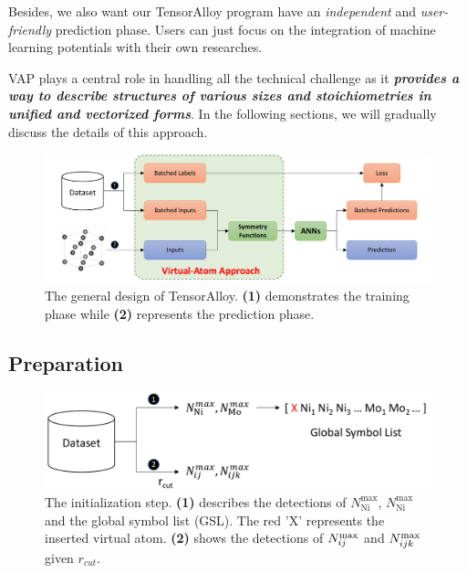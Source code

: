 \documentclass[final,1p,times]{elsarticle}
\begin{document}
Besides, we also want our TensorAlloy program have an \textit{independent} and
\textit{user-friendly} prediction phase. Users can just focus on the integration 
of machine learning potentials with their own researches.

VAP plays a central role in handling all the technical challenge as it 
\textbf{\textit{provides a way to describe structures of various sizes and 
stoichiometries in unified and vectorized forms}}. 
In the following sections, we will gradually discuss the details of this 
approach.

% 
%
\begin{figure}[h!]
\centering
\includegraphics[scale=0.55]{figures/Fig1.pdf}
\caption{\label{fig:program_design} The general design of TensorAlloy. 
\textbf{(1)} demonstrates the training phase while \textbf{(2)} represents the 
prediction phase.
}
\end{figure}

% 
%
\subsection{Preparation}
\label{section:preparation}

% 
%
\begin{figure}[h!]
\centering
\includegraphics[scale=0.6]{figures/Fig2.pdf}
\caption{\label{fig:Fig2} The initialization step. 
\textbf{(1)} describes the detections of $N_{\mathrm{Ni}}^{\mathrm{max}}$, 
$N_{\mathrm{Ni}}^{\mathrm{max}}$ and the global symbol list (GSL). The red 'X' 
represents the inserted virtual atom.
\textbf{(2)} shows the detections of $N_{ij}^{\mathrm{max}}$ and $N_{ijk}^{\mathrm{max}}$ given $r_{cut}$.
}
\end{figure}
\end{document}
